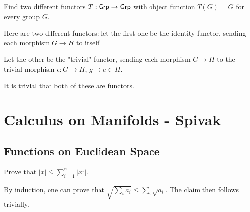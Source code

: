 \documentclass[11pt, english]{article}
\begin{document}
\begin{exc}[1.5]
Find two different functors $T:\mathsf{Grp} \to \mathsf{Grp}$ with object function $T(G)=G$ for every group $G$.
\end{exc}
\begin{sol}
Here are two different functors: let the first one be the identity functor, sending each morphism $G \to H$ to itself. 

Let the other be the "trivial" functor, sending each morphism $G \to H$ to the trivial morphism $\epsilon:G \to H$, $g \mapsto e \in H$.

It is trivial that both of these are functors.
\end{sol}










\section{Calculus on Manifolds - Spivak}

\subsection{Functions on Euclidean Space}

\begin{exc}[Exercise 1.1]
Prove that $\lvert x \rvert \leq \sum_{i=1}^n \lvert x^i  \rvert$.  
\end{exc}
\begin{sol}
 By induction, one can prove that $\sqrt{\sum_i a_i} \leq \sum_i \sqrt{a_i}$. The claim then follows trivially.
\end{sol}
\end{document}

